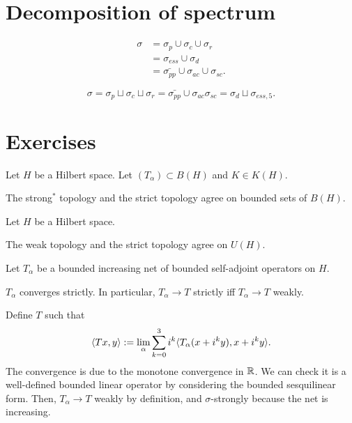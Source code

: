\documentclass{../../large}
\begin{document}
\section{Decomposition of spectrum}

\begin{align*}
\sigma
&=\sigma_p\cup\sigma_c\cup\sigma_r\\
&=\sigma_{ess}\cup\sigma_d\\
&=\bar{\sigma_{pp}}\cup\sigma_{ac}\cup\sigma_{sc}.
\end{align*}


\[\sigma=\sigma_p\sqcup\sigma_c\sqcup\sigma_r=\bar{\sigma_{pp}}\cup\sigma_{ac}\sigma_{sc}=\sigma_d\sqcup\sigma_{ess,5}.\]





\section*{Exercises}


\begin{prb}
Let $H$ be a Hilbert space.
Let $(T_\alpha)\subset B(H)$ and $K\in K(H)$.
\begin{parts}
\item The strong$^*$ topology and the strict topology agree on bounded sets of $B(H)$.
\end{parts}
\end{prb}

\begin{prb}
Let $H$ be a Hilbert space.
\begin{parts}
\item The weak topology and the strict topology agree on $U(H)$.
\end{parts}
\end{prb}


\begin{prb}
Let $T_\alpha$ be a bounded increasing net of bounded self-adjoint operators on $H$.
\begin{parts}
\item $T_\alpha$ converges strictly. In particular, $T_\alpha\to T$ strictly iff $T_\alpha\to T$ weakly.
\end{parts}
\end{prb}
\begin{pf}
Define $T$ such that
\[\langle Tx,y\rangle:=\lim_\alpha\sum_{k=0}^3i^k\langle T_\alpha(x+i^ky),x+i^ky\rangle.\]
The convergence is due to the monotone convergence in $\mathbb{R}$.
We can check it is a well-defined bounded linear operator by considering the bounded sesquilinear form.
Then, $T_\alpha\to T$ weakly by definition, and $\sigma$-strongly because the net is increasing.
\end{pf}
\end{document}
